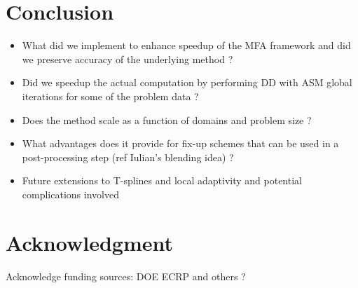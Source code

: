 \documentclass[conference]{IEEEtran}
\begin{document}


\section{Conclusion}

\begin{itemize}
	\item What did we implement to enhance speedup of the MFA framework and did we preserve accuracy of the underlying method ?
	\item Did we speedup the actual computation by performing DD with ASM global iterations for some of the problem data ?
	\item Does the method scale as a function of domains and problem size ? 
	\item What advantages does it provide for fix-up schemes that can be used in a post-processing step (ref Iulian's blending idea) ?
	\item Future extensions to T-splines and local adaptivity and potential complications involved
\end{itemize}

\section*{Acknowledgment}

Acknowledge funding sources: DOE ECRP and others ?
\end{document}

